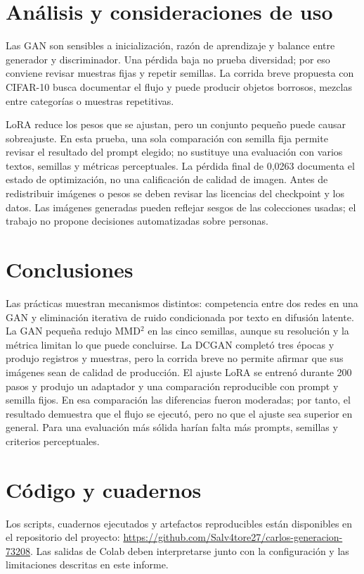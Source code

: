 \documentclass[12pt,letterpaper]{article}
\begin{document}
\section{Análisis y consideraciones de uso}
Las GAN son sensibles a inicialización, razón de aprendizaje y balance entre generador y discriminador. Una pérdida baja no prueba diversidad; por eso conviene revisar muestras fijas y repetir semillas. La corrida breve propuesta con CIFAR-10 busca documentar el flujo y puede producir objetos borrosos, mezclas entre categorías o muestras repetitivas.\par
LoRA reduce los pesos que se ajustan, pero un conjunto pequeño puede causar sobreajuste. En esta prueba, una sola comparación con semilla fija permite revisar el resultado del prompt elegido; no sustituye una evaluación con varios textos, semillas y métricas perceptuales. La pérdida final de 0,0263 documenta el estado de optimización, no una calificación de calidad de imagen. Antes de redistribuir imágenes o pesos se deben revisar las licencias del checkpoint y los datos. Las imágenes generadas pueden reflejar sesgos de las colecciones usadas; el trabajo no propone decisiones automatizadas sobre personas.

\section{Conclusiones}
Las prácticas muestran mecanismos distintos: competencia entre dos redes en una GAN y eliminación iterativa de ruido condicionada por texto en difusión latente. La GAN pequeña redujo MMD$^2$ en las cinco semillas, aunque su resolución y la métrica limitan lo que puede concluirse. La DCGAN completó tres épocas y produjo registros y muestras, pero la corrida breve no permite afirmar que sus imágenes sean de calidad de producción. El ajuste LoRA se entrenó durante 200 pasos y produjo un adaptador y una comparación reproducible con prompt y semilla fijos. En esa comparación las diferencias fueron moderadas; por tanto, el resultado demuestra que el flujo se ejecutó, pero no que el ajuste sea superior en general. Para una evaluación más sólida harían falta más prompts, semillas y criterios perceptuales.

\section{Código y cuadernos}
Los scripts, cuadernos ejecutados y artefactos reproducibles están disponibles en el repositorio del proyecto: \url{https://github.com/Salv4tore27/carlos-generacion-73208}. Las salidas de Colab deben interpretarse junto con la configuración y las limitaciones descritas en este informe.
\end{document}

